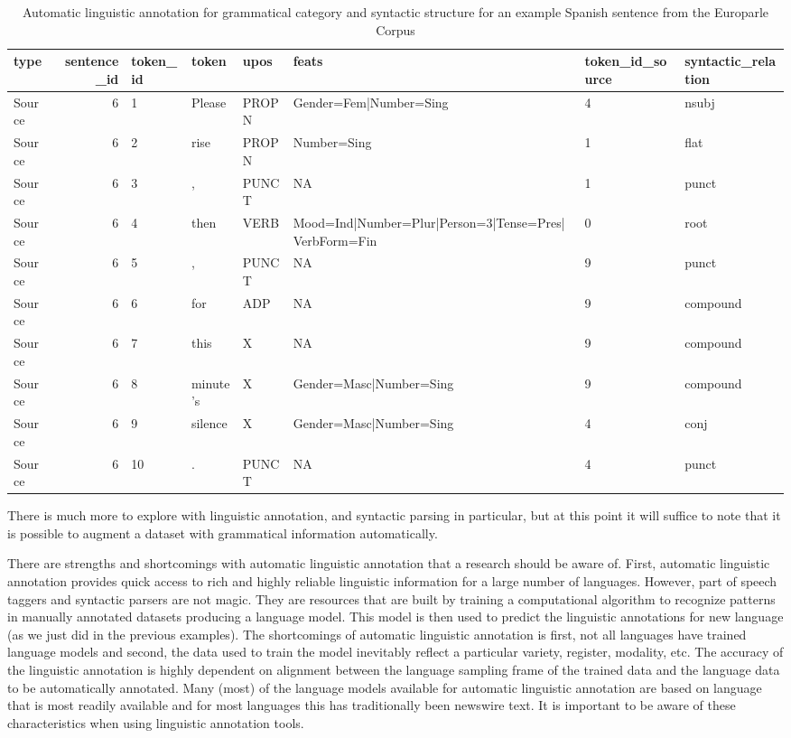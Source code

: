 \documentclass[
]{article}
\begin{document}
\begin{table}

\caption{\label{tab:generation-europarle-es-example}Automatic linguistic annotation for grammatical category and syntactic structure for an example Spanish sentence from the Europarle Corpus}
\centering
\begin{tabular}[t]{lrllllll}
\toprule
type & sentence\_id & token\_id & token & upos & feats & token\_id\_source & syntactic\_relation\\
\midrule
Source & 6 & 1 & Please & PROPN & Gender=Fem|Number=Sing & 4 & nsubj\\
Source & 6 & 2 & rise & PROPN & Number=Sing & 1 & flat\\
Source & 6 & 3 & , & PUNCT & NA & 1 & punct\\
Source & 6 & 4 & then & VERB & Mood=Ind|Number=Plur|Person=3|Tense=Pres|VerbForm=Fin & 0 & root\\
Source & 6 & 5 & , & PUNCT & NA & 9 & punct\\
\addlinespace
Source & 6 & 6 & for & ADP & NA & 9 & compound\\
Source & 6 & 7 & this & X & NA & 9 & compound\\
Source & 6 & 8 & minute's & X & Gender=Masc|Number=Sing & 9 & compound\\
Source & 6 & 9 & silence & X & Gender=Masc|Number=Sing & 4 & conj\\
Source & 6 & 10 & . & PUNCT & NA & 4 & punct\\
\bottomrule
\end{tabular}
\end{table}

There is much more to explore with linguistic annotation, and syntactic parsing in particular, but at this point it will suffice to note that it is possible to augment a dataset with grammatical information automatically.

There are strengths and shortcomings with automatic linguistic annotation that a research should be aware of. First, automatic linguistic annotation provides quick access to rich and highly reliable linguistic information for a large number of languages. However, part of speech taggers and syntactic parsers are not magic. They are resources that are built by training a computational algorithm to recognize patterns in manually annotated datasets producing a language model. This model is then used to predict the linguistic annotations for new language (as we just did in the previous examples). The shortcomings of automatic linguistic annotation is first, not all languages have trained language models and second, the data used to train the model inevitably reflect a particular variety, register, modality, etc. The accuracy of the linguistic annotation is highly dependent on alignment between the language sampling frame of the trained data and the language data to be automatically annotated. Many (most) of the language models available for automatic linguistic annotation are based on language that is most readily available and for most languages this has traditionally been newswire text. It is important to be aware of these characteristics when using linguistic annotation tools.
\end{document}
